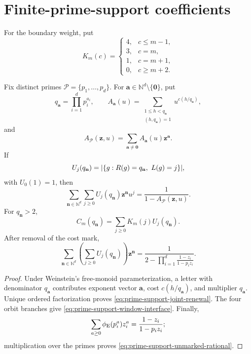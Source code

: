 \section{Finite-prime-support coefficients}

For the boundary weight, put
\[
 K_m(c)=
 \begin{cases}
 4,&c\le m-1,\\
 3,&c=m,\\
 1,&c=m+1,\\
 0,&c\ge m+2.
 \end{cases}
\]

\begin{proposition}
\label{prop:prime-support-interface}
Fix distinct primes \(\mathcal P=\{p_1,\ldots,p_d\}\).  For
\(\mathbf a\in\mathbb N^d\setminus\{\mathbf0\}\), put
\[
 q_{\mathbf a}=\prod_{i=1}^dp_i^{a_i},
 \qquad
 A_{\mathbf a}(u)=
 \sum_{\substack{1\le h<q_{\mathbf a}\\(h,q_{\mathbf a})=1}}
 u^{c(h/q_{\mathbf a})},
\]
and
\[
 A_{\mathcal P}(\mathbf z,u)=
 \sum_{\mathbf a\ne\mathbf0}A_{\mathbf a}(u)\mathbf z^{\mathbf a}.
\]
If
\[
 U_j(q_{\mathbf n})=\lvert \{g:R(g)=q_{\mathbf n},\ L(g)=j\} \rvert,
\]
with \(U_0(1)=1\), then
\begin{equation}
 \sum_{\mathbf n\in\mathbb N^d}\sum_{j\ge0}
 U_j(q_{\mathbf n})\mathbf z^{\mathbf n}u^j
 =\frac1{1-A_{\mathcal P}(\mathbf z,u)}.
 \label{eq:prime-support-joint-renewal}
\end{equation}
For \(q_{\mathbf n}>2\),
\begin{equation}
 C_m(q_{\mathbf n})=\sum_{j\ge0}K_m(j)U_j(q_{\mathbf n}).
 \label{eq:prime-support-window-interface}
\end{equation}
After removal of the cost mark,
\begin{equation}
 \sum_{\mathbf n\in\mathbb N^d}
 \left(\sum_{j\ge0}U_j(q_{\mathbf n})\right)\mathbf z^{\mathbf n}
 =\frac1{\displaystyle
 2-\prod_{i=1}^d\frac{1-z_i}{1-p_i z_i}}.
 \label{eq:prime-support-unmarked-rational}
\end{equation}
\end{proposition}

\begin{proof}
Under Weinstein's free-monoid parameterization, a letter with denominator
\(q_{\mathbf a}\) contributes exponent vector \(\mathbf a\), cost
\(c(h/q_{\mathbf a})\), and multiplier \(q_{\mathbf a}\).  Unique ordered
factorization proves \eqref{eq:prime-support-joint-renewal}.  The four orbit
branches give \eqref{eq:prime-support-window-interface}.  Finally,
\[
 \sum_{a\ge0}\phi_{\rm E}(p_i^a)z_i^a=\frac{1-z_i}{1-p_i z_i};
\]
multiplication over the primes proves
\eqref{eq:prime-support-unmarked-rational}.
\end{proof}

